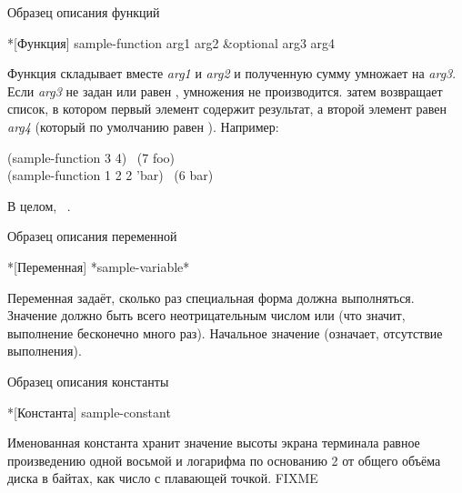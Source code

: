 \begin{table}[t]
\caption{Образец описания функций}
\label{Sample-Function-Description}
\begin{defun}*[Функция]
sample-function arg1 arg2 &optional arg3 arg4

Функция  складывает вместе \emph{arg1} и \emph{arg2} и
полученную сумму умножает на \emph{arg3}. Если \emph{arg3} не задан или равен
{\nil}, умножения не производится.  затем возвращает список,
в котором первый элемент содержит результат, а второй элемент равен \emph{arg4}
(который по умолчанию равен ).
Например:
\begin{lisp}
(sample-function 3 4) \EV\ (7 foo) \\
(sample-function 1 2 2 'bar) \EV\ (6 bar)
\end{lisp}
В целом,
 \EQ\ .
\end{defun}

\caption{Образец описания переменной}
\label{Sample-Variable-Description}
\begin{defun}*[Переменная]
*sample-variable*

Переменная  задаёт, сколько раз специальная
форма  должна выполняться. Значение должно быть всего
неотрицательным числом или {\nil} (что значит, выполнение бесконечно много
раз). Начальное значение  (означает, отсутствие выполнения).
\end{defun}

\caption{Образец описания константы}
\label{Sample-Constant-Description}
\begin{defun}*[Константа]
sample-constant

Именованная константа  хранит значение высоты экрана
терминала равное произведению одной восьмой и логарифма по основанию 2 от общего
объёма диска в байтах, как число с плавающей точкой. FIXME
\end{defun}
\end{table}

